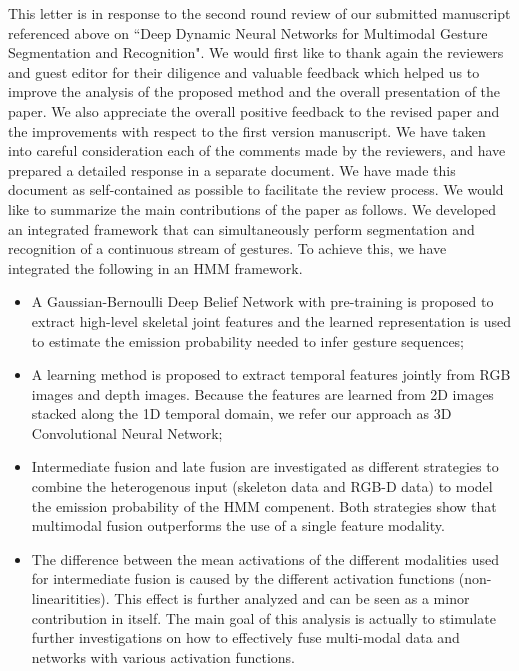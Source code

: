 \documentclass[12pt]{article}
\begin{document}
This letter is in response to the second round review of our submitted manuscript referenced above on ``Deep Dynamic Neural Networks for Multimodal Gesture Segmentation and Recognition".
%
We would first like to thank again the reviewers and guest editor for their diligence and valuable feedback which helped us to improve the analysis of the proposed method and the overall presentation of the paper.
%
We also appreciate the overall positive feedback to the revised paper and the improvements with respect to the first version manuscript.
%
We have taken into careful consideration each of the  comments made by the reviewers, and have prepared a detailed response
in a separate document.
%
We have made this document as self-contained as possible to facilitate the review process.
%
We would like to summarize the main contributions of the paper as follows.
We developed an integrated framework that can simultaneously perform segmentation and recognition of a continuous stream of gestures. To achieve this, we have integrated the following in an HMM framework.
\begin{itemize}
\item A Gaussian-Bernoulli Deep Belief Network with pre-training is proposed to extract high-level skeletal joint features and the learned representation is used to estimate the emission probability needed to infer gesture sequences;
\item A learning method is proposed to extract temporal features jointly from RGB images and depth images. Because the features are learned from 2D images stacked along the 1D temporal domain, we refer our approach as 3D Convolutional Neural Network;
\item Intermediate fusion and late fusion are investigated as different strategies to combine the heterogenous input (skeleton data and RGB-D data) to model the emission probability of the HMM compenent. Both strategies show that multimodal fusion outperforms the use of a single feature modality.
\item The difference between the mean activations of the different modalities used for intermediate fusion is caused by the different activation functions (non-linearitities). This effect is further analyzed and can be seen as a minor contribution in itself. The main goal of this analysis is actually to stimulate further investigations on how to effectively fuse multi-modal data and networks with various activation functions.
\end{itemize}
\end{document}
